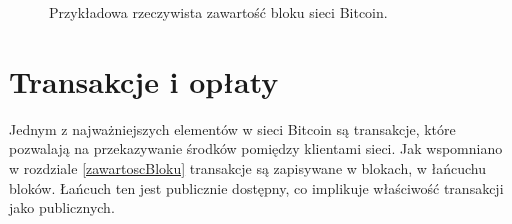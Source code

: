 \documentclass[12pt, twoside, final, openany]{mgr}
\begin{document}
\begin{figure}[H]
	\begin{center}	
	\end{center}
	\caption{Przykładowa rzeczywista zawartość bloku sieci Bitcoin.}
	\label{fig:przykladowyBlok}
\end{figure}
\section{Transakcje i opłaty}
\label{transakcje}

\indent Jednym z najważniejszych elementów w sieci Bitcoin są transakcje, które pozwalają na przekazywanie środków pomiędzy klientami sieci. Jak wspomniano w rozdziale \ref{zawartoscBloku} transakcje są zapisywane w blokach, w łańcuchu bloków. Łańcuch ten jest publicznie dostępny, co implikuje właściwość transakcji jako publicznych. 
\end{document}
